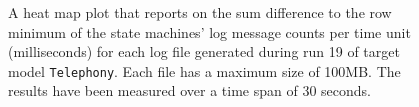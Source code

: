 \begin{figure}[htbp]
\centering
\begin{minipage}{1\textwidth}
  \centering
\end{minipage}
\caption{A heat map plot that reports on the sum difference to the row minimum of the state machines' log message counts per time unit (milliseconds) for each log file generated during run 19 of target model \texttt{Telephony}. Each file has a maximum size of 100MB. The results have been measured over a time span of 30 seconds.}
\label{figure:throughput_difference_random_det_telephony_19}
\end{figure}